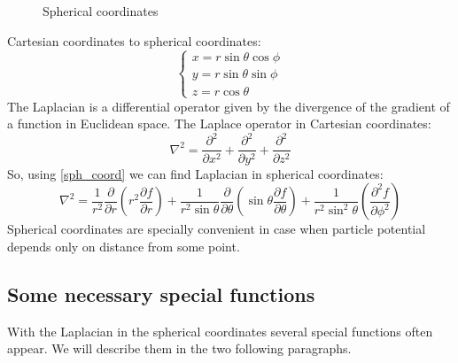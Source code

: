 \documentclass[a4paper, 12pt]{article}
\begin{document}
%
%
\begin{figure}[h!]
\begin{center}
\end{center}
\caption{Spherical coordinates}
\end{figure}
Cartesian coordinates to spherical coordinates:
\begin{equation} \label{sph_coord}
\begin{cases}
	{x}= {r} \sin{\theta}\cos{\phi} \\
	{y} = {r} \sin{\theta}\sin{\phi} \\
	{z} = {r}\cos{\theta}
\end{cases}
\end{equation}
The Laplacian is a differential operator given by the divergence of the gradient of a function in Euclidean space. The Laplace operator in Cartesian coordinates:
 	$$\nabla^2= \frac{\partial^2}{\partial x^2}  + \frac{\partial^2}{\partial y^2} + \frac{\partial^2}{\partial z^2}$$
So, using \eqref{sph_coord} we can find Laplacian in spherical coordinates:
\begin{equation}\label{sph_lap}
	\nabla^2 = \frac{1}{r^2} \frac{\partial}{\partial r}({r^2}\frac{\partial f}{\partial r})+\frac{1}{r^2\sin{\theta}}\frac{\partial}{\partial \theta}(\sin{\theta}\frac{\partial f}{\partial \theta})+\frac{1}{r^2\sin^2{\theta}}(\frac{\partial^2 f}{\partial \phi^2})
\end{equation}
Spherical coordinates are specially convenient in case when particle potential depends only on distance from some point.


\subsection{Some  necessary special functions}
With the Laplacian in the spherical coordinates several special functions often appear.  We will describe them in the two following paragraphs.
\end{document}
